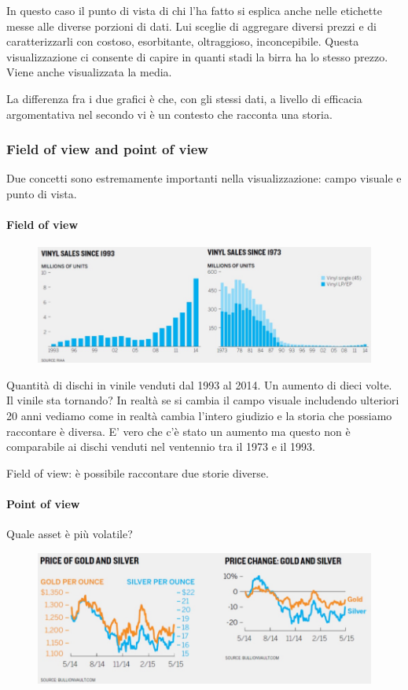 \documentclass[12pt,a4paper]{report}
\begin{document}
In questo caso il punto di vista di chi l'ha fatto si esplica anche nelle etichette messe alle diverse porzioni di dati. Lui sceglie di aggregare diversi prezzi e di caratterizzarli con costoso, esorbitante, oltraggioso, inconcepibile. Questa visualizzazione ci consente di capire in quanti stadi la birra ha lo stesso prezzo. Viene anche visualizzata la media. 

La differenza fra i due grafici è che, con gli stessi dati, a livello di efficacia argomentativa nel secondo vi è un contesto che racconta una storia. 

\subsubsection{Field of view and point of view}

Due concetti sono estremamente importanti nella visualizzazione: campo visuale e punto di vista. 

\paragraph{Field of view}

\begin{figure}[h]
	\centering
	\includegraphics[width=.4\textwidth]{imgs datavis/vinili.png}\hfil
	
	\caption{}\label{}
\end{figure}

Quantità di dischi in vinile venduti dal 1993 al 2014. Un aumento di dieci volte. Il vinile sta tornando? In realtà se si cambia il campo visuale includendo ulteriori 20 anni vediamo come in realtà cambia l'intero giudizio e la storia che possiamo raccontare è diversa. E' vero che c'è stato un aumento ma questo non è comparabile ai dischi venduti nel ventennio tra il 1973 e il 1993. 

Field of view: è possibile raccontare due storie diverse. 
\paragraph{Point of view}
Quale asset è più volatile? 
\begin{figure}[h]
	\centering
	\includegraphics[width=.48\textwidth]{imgs datavis/oro vs argento.png}\hfil
	
	\caption{}\label{}
\end{figure}
\end{document}
